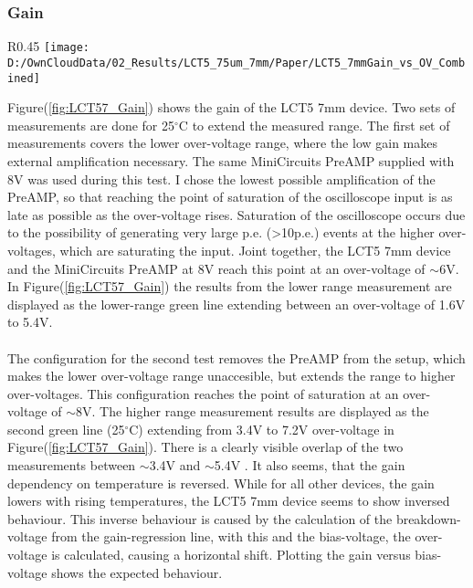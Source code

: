 \documentclass[12pt,article,type=msc,colorback,accentcolor=tud9c]{tudthesis}
\begin{document}
\clearpage
\subsubsection{Gain}
\label{subsubsec:LCT57Gain}
\begin{wrapfigure}{R}{0.45\textwidth}
\centering
\texttt{[image: D:/OwnCloudData/02\_Results/LCT5\_75um\_7mm/Paper/LCT5\_7mmGain\_vs\_OV\_Combined]}
\caption{\label{fig:LCT57_Gain}Gain of the HPK LCT5 7mm pixel}
\end{wrapfigure}
Figure(\ref{fig:LCT57_Gain}) shows the gain of the LCT5 7mm device. Two sets of measurements are done for 25$^\circ$C to extend the measured range. The first set of measurements covers the lower over-voltage range, where the low gain makes external amplification necessary. The same MiniCircuits PreAMP supplied with 8V was used during this test. I chose the lowest possible amplification of the PreAMP, so that reaching the point of saturation of the oscilloscope input is as late as possible as the over-voltage rises. Saturation of the oscilloscope occurs due to the possibility of generating very large p.e. (>10p.e.) events at the higher over-voltages, which are saturating the input. Joint together, the LCT5 7mm device and the MiniCircuits PreAMP at 8V reach this point at an over-voltage of $\sim$6V. In Figure(\ref{fig:LCT57_Gain}) the results from the lower range measurement are displayed as the lower-range green line extending between an over-voltage of 1.6V to 5.4V.
\\\\
The configuration for the second test removes the PreAMP from the setup, which makes the lower over-voltage range unaccesible, but extends the range to higher over-voltages. This configuration reaches the point of saturation at an over-voltage of $\sim$8V. The higher range measurement results are displayed as the second green line (25$^\circ$C) extending from 3.4V to 7.2V over-voltage in Figure(\ref{fig:LCT57_Gain}). There is a clearly visible overlap of the two measurements between $\sim$3.4V and $\sim$5.4V . It also seems, that the gain dependency on temperature is reversed. While for all other devices, the gain lowers with rising temperatures, the LCT5 7mm device seems to show inversed behaviour. This inverse behaviour is caused by the calculation of the breakdown-voltage from the gain-regression line, with this and the bias-voltage, the over-voltage is calculated, causing a horizontal shift. Plotting the gain versus bias-voltage shows the expected behaviour.
\end{document}
